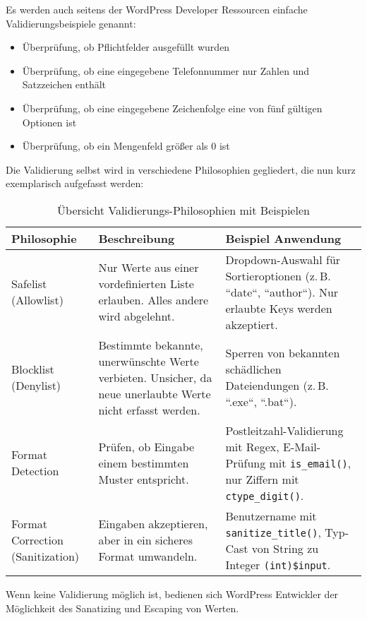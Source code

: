 Es werden auch seitens der WordPress Developer Ressourcen einfache Validierungsbeispiele genannt:
\begin{itemize}
\item Überprüfung, ob Pflichtfelder ausgefüllt wurden
\item Überprüfung, ob eine eingegebene Telefonnummer nur Zahlen und Satzzeichen enthält
\item Überprüfung, ob eine eingegebene Zeichenfolge eine von fünf gültigen Optionen ist
\item Überprüfung, ob ein Mengenfeld größer als 0 ist
\end{itemize}
Die Validierung selbst wird in verschiedene Philosophien gegliedert, die nun kurz exemplarisch aufgefasst werden:
\begin{table}[h]
 \centering
 \renewcommand{\arraystretch}{1.3}
 \begin{tabular}{|p{3cm}|p{5cm}|p{6cm}|}
  \hline
  \textbf{Philosophie} & \textbf{Beschreibung} & \textbf{Beispiel Anwendung} \\
  \hline
  Safelist \newline (Allowlist)
  & Nur Werte aus einer vordefinierten Liste erlauben. Alles andere wird abgelehnt.
  & Dropdown-Auswahl für Sortieroptionen (z.\,B. ``date``, ``author``). Nur erlaubte Keys werden akzeptiert. \\
  \hline
  Blocklist \newline (Denylist)
  & Bestimmte bekannte, unerwünschte Werte verbieten. Unsicher, da neue unerlaubte Werte nicht erfasst werden.
  & Sperren von bekannten schädlichen Dateiendungen (z.\,B. ``.exe``, ``.bat``). \\
  \hline
  Format Detection
  & Prüfen, ob Eingabe einem bestimmten Muster entspricht.
  & Postleitzahl-Validierung mit Regex, E-Mail-Prüfung mit \texttt{is\_email()}, nur Ziffern mit \texttt{ctype\_digit()}. \\
  \hline
  Format Correction (Sanitization)
  & Eingaben akzeptieren, aber in ein sicheres Format umwandeln.
  & Benutzername mit  \newline \texttt{sanitize\_title()}, Typ-Cast von String zu Integer \texttt{(int)\$input}. \\
  \hline
 \end{tabular}
 \caption{Übersicht Validierungs-Philosophien mit Beispielen}
\end{table}

\newpage
Wenn keine Validierung möglich ist, bedienen sich WordPress Entwickler der Möglichkeit des Sanatizing und Escaping von Werten.

